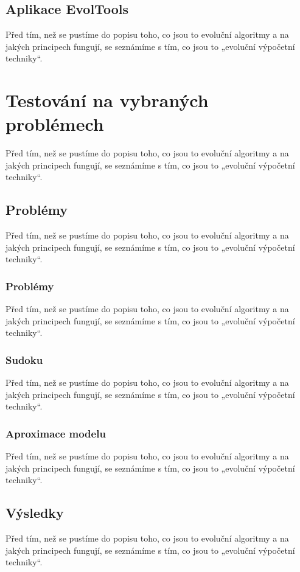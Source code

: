 \documentclass[bc,male,java,dept460]{diploma}		%
\begin{document}
\subsection{Aplikace EvolTools}
Před tím, než se pustíme do popisu toho, co jsou to evoluční algoritmy a na jakých principech fungují, se seznámíme s tím, co jsou to „evoluční výpočetní techniky“.

\section{Testování na vybraných problémech}
Před tím, než se pustíme do popisu toho, co jsou to evoluční algoritmy a na jakých principech fungují, se seznámíme s tím, co jsou to „evoluční výpočetní techniky“.

\subsection{Problémy}
Před tím, než se pustíme do popisu toho, co jsou to evoluční algoritmy a na jakých principech fungují, se seznámíme s tím, co jsou to „evoluční výpočetní techniky“.

\subsubsection{Problémy}
Před tím, než se pustíme do popisu toho, co jsou to evoluční algoritmy a na jakých principech fungují, se seznámíme s tím, co jsou to „evoluční výpočetní techniky“.

\subsubsection{Sudoku}
Před tím, než se pustíme do popisu toho, co jsou to evoluční algoritmy a na jakých principech fungují, se seznámíme s tím, co jsou to „evoluční výpočetní techniky“.

\subsubsection{Aproximace modelu}
Před tím, než se pustíme do popisu toho, co jsou to evoluční algoritmy a na jakých principech fungují, se seznámíme s tím, co jsou to „evoluční výpočetní techniky“.

\subsection{Výsledky}
Před tím, než se pustíme do popisu toho, co jsou to evoluční algoritmy a na jakých principech fungují, se seznámíme s tím, co jsou to „evoluční výpočetní techniky“.
\end{document}
